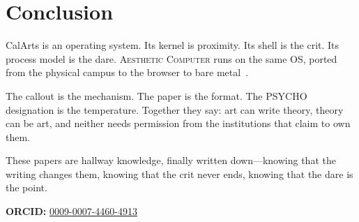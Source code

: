 \documentclass[10pt,letterpaper,twocolumn]{article}
\newcommand{\ac}{\textsc{Aesthetic Computer}}
\begin{document}
\section{Conclusion}

CalArts is an operating system. Its kernel is proximity. Its shell is the crit. Its process model is the dare. \ac{} runs on the same OS, ported from the physical campus to the browser to bare metal~\citep{scudder2026ac, scudder2026os}.

The callout is the mechanism. The paper is the format. The PSYCHO designation is the temperature. Together they say: art can write theory, theory can be art, and neither needs permission from the institutions that claim to own them.

These papers are hallway knowledge, finally written down---knowing that the writing changes them, knowing that the crit never ends, knowing that the dare is the point.

\vspace{0.5em}
\noindent\textbf{ORCID:} \href{https://orcid.org/0009-0007-4460-4913}{0009-0007-4460-4913}



\end{document}
